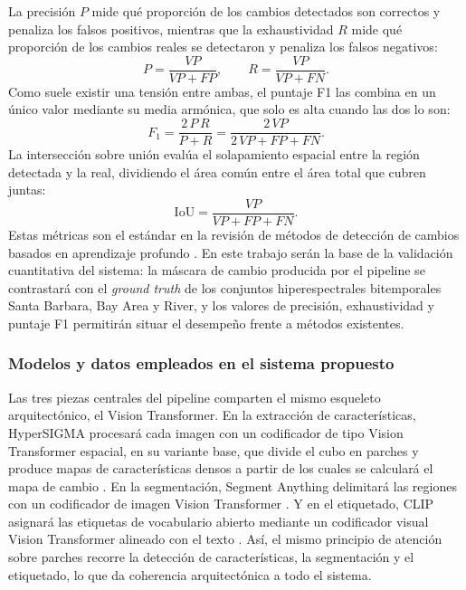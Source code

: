 La precisión $P$ mide qué proporción de los cambios detectados son correctos y penaliza los falsos positivos, mientras que la exhaustividad $R$ mide qué proporción de los cambios reales se detectaron y penaliza los falsos negativos:
\begin{equation}
P=\frac{VP}{VP+FP},\qquad R=\frac{VP}{VP+FN}.
\end{equation}
Como suele existir una tensión entre ambas, el puntaje F1 las combina en un único valor mediante su media armónica, que solo es alta cuando las dos lo son:
\begin{equation}
F_1=\frac{2\,P\,R}{P+R}=\frac{2\,VP}{2\,VP+FP+FN}.
\end{equation}
La intersección sobre unión evalúa el solapamiento espacial entre la región detectada y la real, dividiendo el área común entre el área total que cubren juntas:
\begin{equation}
\mathrm{IoU}=\frac{VP}{VP+FP+FN}.
\end{equation}
Estas métricas son el estándar en la revisión de métodos de detección de cambios basados en aprendizaje profundo \parencite{khelifi2020deep}. En este trabajo serán la base de la validación cuantitativa del sistema: la máscara de cambio producida por el pipeline se contrastará con el \textit{ground truth} de los conjuntos hiperespectrales bitemporales Santa Barbara, Bay Area y River, y los valores de precisión, exhaustividad y puntaje F1 permitirán situar el desempeño frente a métodos existentes.

\subsubsection{Modelos y datos empleados en el sistema propuesto}

Las tres piezas centrales del pipeline comparten el mismo esqueleto arquitectónico, el Vision Transformer. En la extracción de características, HyperSIGMA procesará cada imagen con un codificador de tipo Vision Transformer espacial, en su variante base, que divide el cubo en parches y produce mapas de características densos a partir de los cuales se calculará el mapa de cambio \parencite{wang2024hypersigma}. En la segmentación, Segment Anything delimitará las regiones con un codificador de imagen Vision Transformer \parencite{kirillov2023sam}. Y en el etiquetado, CLIP asignará las etiquetas de vocabulario abierto mediante un codificador visual Vision Transformer alineado con el texto \parencite{radford2021clip}. Así, el mismo principio de atención sobre parches recorre la detección de características, la segmentación y el etiquetado, lo que da coherencia arquitectónica a todo el sistema.

